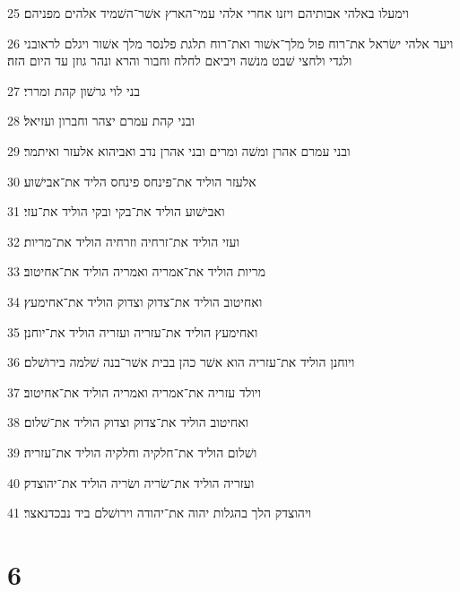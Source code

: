 \par 25 וימעלו באלהי אבותיהם ויזנו אחרי אלהי עמי־הארץ אשׁר־השׁמיד אלהים מפניהם׃
\par 26 ויער אלהי ישׂראל את־רוח פול מלך־אשׁור ואת־רוח תלגת פלנסר מלך אשׁור ויגלם לראובני ולגדי ולחצי שׁבט מנשׁה ויביאם לחלח וחבור והרא ונהר גוזן עד היום הזה׃
\par 27 בני לוי גרשׁון קהת ומררי׃
\par 28 ובני קהת עמרם יצהר וחברון ועזיאל׃
\par 29 ובני עמרם אהרן ומשׁה ומרים ובני אהרן נדב ואביהוא אלעזר ואיתמר׃
\par 30 אלעזר הוליד את־פינחס פינחס הליד את־אבישׁוע׃
\par 31 ואבישׁוע הוליד את־בקי ובקי הוליד את־עזי׃
\par 32 ועזי הוליד את־זרחיה וזרחיה הוליד את־מריות׃
\par 33 מריות הוליד את־אמריה ואמריה הוליד את־אחיטוב׃
\par 34 ואחיטוב הוליד את־צדוק וצדוק הוליד את־אחימעץ׃
\par 35 ואחימעץ הוליד את־עזריה ועזריה הוליד את־יוחנן׃
\par 36 ויוחנן הוליד את־עזריה הוא אשׁר כהן בבית אשׁר־בנה שׁלמה בירושׁלם׃
\par 37 ויולד עזריה את־אמריה ואמריה הוליד את־אחיטוב׃
\par 38 ואחיטוב הוליד את־צדוק וצדוק הוליד את־שׁלום׃
\par 39 ושׁלום הוליד את־חלקיה וחלקיה הוליד את־עזריה׃
\par 40 ועזריה הוליד את־שׂריה ושׂריה הוליד את־יהוצדק׃
\par 41 ויהוצדק הלך בהגלות יהוה את־יהודה וירושׁלם ביד נבכדנאצר׃

\chapter{6}

